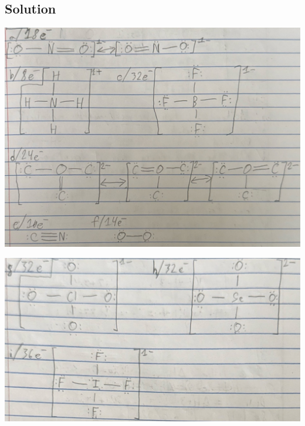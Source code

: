 \documentclass[10pt]{article}
\begin{document}
        \subsection{Solution}
            \begin{center}
                \includegraphics[width=\textwidth]{Answers Images/F3a.jpg}

                \includegraphics[width=\textwidth]{Answers Images/F3b.jpg}
            \end{center}


    \pagebreak
\end{document}
